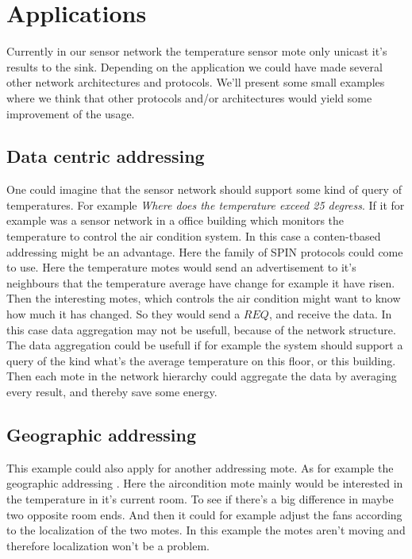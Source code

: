 \section{Applications}
Currently in our sensor network the temperature sensor mote only unicast it's results to the sink. Depending on the application we could have made several other network architectures and protocols. We'll present some small examples where we think that other protocols and/or architectures would yield some improvement of the usage.
\subsection{Data centric addressing}
 One could imagine that the sensor network should support some kind of query of temperatures. For example \emph{Where does the temperature exceed 25 degress}. If it for example was a sensor network in a office building which monitors the temperature to control the air condition system. In this case a conten-tbased addressing\cite[p.~194]{karl2007protocols} might be an advantage. Here the family of SPIN \cite[p.~335-336]{karl2007protocols} protocols could come to use. Here the temperature motes would send an advertisement to it's neighbours that the temperature average have change for example it have risen. Then the interesting motes, which controls the air condition might want to know how much it has changed. So they would send a $REQ$, and receive the data. In this case data aggregation may not be usefull, because of the network structure. The data aggregation could be usefull if for example the system should support a query of the kind what's the average temperature on this floor, or this building. Then each mote in the network hierarchy could aggregate the data by averaging every result, and thereby save some energy.
 \subsection{Geographic addressing}
This example could also apply for another addressing mote. As for example the geographic addressing \cite[p.~195]{karl2007protocols}. Here the aircondition mote mainly would be interested in the temperature in it's current room. To see if there's a big difference in maybe two opposite room ends. And then it could for example adjust the fans according to the localization of the two motes. In this example the motes aren't moving and therefore localization won't be a problem.

